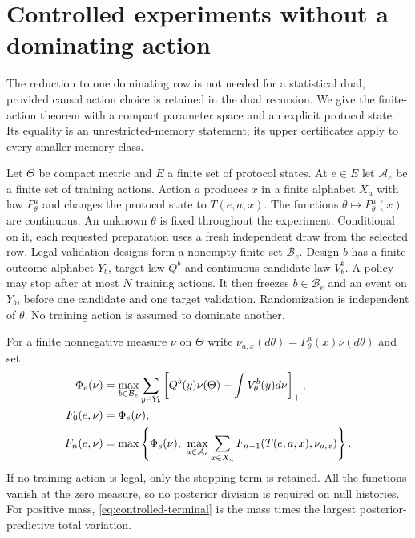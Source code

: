 \section{Controlled experiments without a dominating action}
\label{sec:controlled}
The reduction to one dominating row is not needed for a statistical
dual, provided causal action choice is retained in the dual recursion.
We give the finite-action theorem with a compact parameter space and an
explicit protocol state. Its equality is an unrestricted-memory
statement; its upper certificates apply to every smaller-memory class.

Let $\Theta$ be compact metric and $E$ a finite set of protocol states.
At $e\in E$ let $\mathcal A_e$ be a finite set of training actions.
Action $a$ produces $x$ in a finite alphabet $X_a$ with law
$P^a_\theta$ and changes the protocol state to $T(e,a,x)$.
The functions $\theta\mapsto P^a_\theta(x)$ are continuous.
An unknown $\theta$ is fixed throughout the experiment. Conditional on
it, each requested preparation uses a fresh independent draw from the
selected row. Legal validation designs form a nonempty finite set
$\mathcal B_e$. Design $b$ has a finite outcome alphabet $Y_b$, target
law $Q^b$ and continuous candidate law $V^b_\theta$.
A policy may stop after at most $N$ training actions. It then freezes
$b\in\mathcal B_e$ and an event on $Y_b$, before one candidate and one
target validation. Randomization is independent of $\theta$.
No training action is assumed to dominate another.

For a finite nonnegative measure $\nu$ on $\Theta$ write
$\nu_{a,x}(d\theta)=P^a_\theta(x)\nu(d\theta)$ and set
\begin{align}
 \Phi_e(\nu)&=\max_{b\in\mathcal B_e}\sum_{y\in Y_b}
       \left[Q^b(y)\nu(\Theta)-\int V^b_\theta(y)d\nu\right]_+,
                                                   \label{eq:controlled-terminal}\\
 F_0(e,\nu)&=\Phi_e(\nu),\notag\\
 F_n(e,\nu)&=\max\left\{\Phi_e(\nu),\
        \max_{a\in\mathcal A_e}\sum_{x\in X_a}
           F_{n-1}(T(e,a,x),\nu_{a,x})\right\}.
                                                   \label{eq:controlled-recursion}
\end{align}
If no training action is legal, only the stopping term is retained.
All the functions vanish at the zero measure, so no posterior division
is required on null histories. For positive mass, \eqref{eq:controlled-terminal}
is the mass times the largest posterior-predictive total variation.

